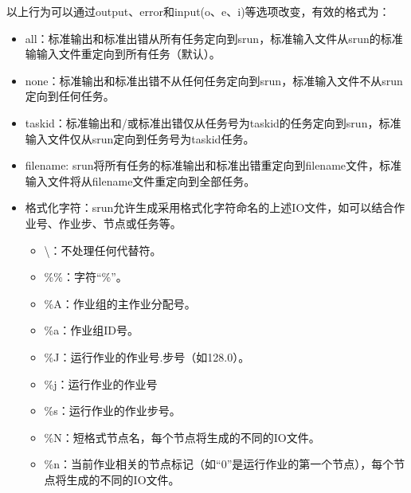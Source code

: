 \documentclass[a4paper,12pt,english]{sphinxmanual}
\begin{document}
\sphinxAtStartPar
以上行为可以通过\sphinxhyphen{}\sphinxhyphen{}output、\sphinxhyphen{}\sphinxhyphen{}error和\sphinxhyphen{}\sphinxhyphen{}input(\sphinxhyphen{}o、\sphinxhyphen{}e、\sphinxhyphen{}i)等选项改变，有效的格式为：
\begin{itemize}
\item {} 
\sphinxAtStartPar
all：标准输出和标准出错从所有任务定向到srun，标准输入文件从srun的标准输输入文件重定向到所有任务（默认）。

\item {} 
\sphinxAtStartPar
none：标准输出和标准出错不从任何任务定向到srun，标准输入文件不从srun定向到任何任务。

\item {} 
\sphinxAtStartPar
taskid：标准输出和/或标准出错仅从任务号为taskid的任务定向到srun，标准输入文件仅从srun定向到任务号为taskid任务。

\item {} 
\sphinxAtStartPar
filename: srun将所有任务的标准输出和标准出错重定向到filename文件，标准输入文件将从filename文件重定向到全部任务。

\item {} 
\sphinxAtStartPar
格式化字符：srun允许生成采用格式化字符命名的上述IO文件，如可以结合作业号、作业步、节点或任务等。
\begin{itemize}
\item {} 
\sphinxAtStartPar
\textbackslash{}：不处理任何代替符。

\item {} 
\sphinxAtStartPar
\%\%：字符“\%”。

\item {} 
\sphinxAtStartPar
\%A：作业组的主作业分配号。

\item {} 
\sphinxAtStartPar
\%a：作业组ID号。

\item {} 
\sphinxAtStartPar
\%J：运行作业的作业号.步号（如128.0）。

\item {} 
\sphinxAtStartPar
\%j：运行作业的作业号

\item {} 
\sphinxAtStartPar
\%s：运行作业的作业步号。

\item {} 
\sphinxAtStartPar
\%N：短格式节点名，每个节点将生成的不同的IO文件。

\item {} 
\sphinxAtStartPar
\%n：当前作业相关的节点标记（如“0”是运行作业的第一个节点），每个节点将生成的不同的IO文件。


\end{itemize}
\end{itemize}
\end{document}
